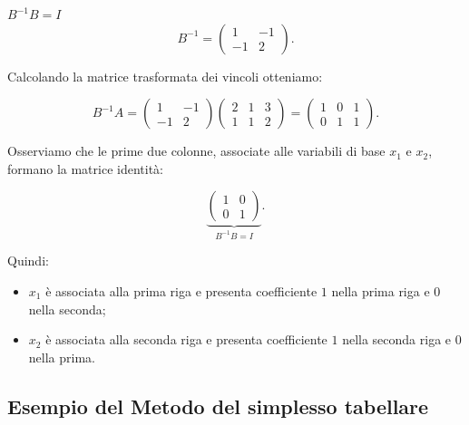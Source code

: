 \begin{observation}{$B^{-1}B=I$}
\[
B^{-1}=
\begin{pmatrix}
1 & -1\\
-1 & 2
\end{pmatrix}.
\]

Calcolando la matrice trasformata dei vincoli otteniamo:

\[
B^{-1}A=
\begin{pmatrix}
1 & -1\\
-1 & 2
\end{pmatrix}
\begin{pmatrix}
2 & 1 & 3\\
1 & 1 & 2
\end{pmatrix}
=
\begin{pmatrix}
1 & 0 & 1\\
0 & 1 & 1
\end{pmatrix}.
\]

Osserviamo che le prime due colonne, associate alle variabili di base $x_1$ e $x_2$, formano la matrice identità:

\[
\underbrace{
\begin{pmatrix}
1 & 0\\
0 & 1
\end{pmatrix}
}_{B^{-1}B=I}.
\]

Quindi:
\begin{itemize}
    \item $x_1$ è associata alla prima riga e presenta coefficiente $1$ nella prima riga e $0$ nella seconda;
    \item $x_2$ è associata alla seconda riga e presenta coefficiente $1$ nella seconda riga e $0$ nella prima.
\end{itemize}


\end{observation}

\newpage

\subsection{Esempio del Metodo del simplesso tabellare}

